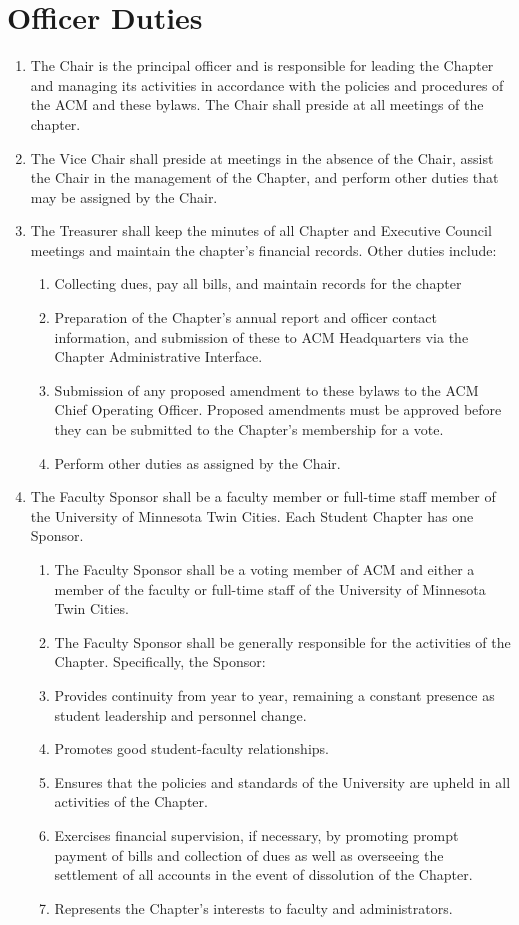 \section{Officer Duties}
\begin{enumerate}
	\item The Chair is the principal officer and is responsible for leading the Chapter and managing its activities in accordance with the policies and procedures of the ACM and these bylaws. The Chair shall preside at all meetings of the chapter.
	\item The Vice Chair shall preside at meetings in the absence of the Chair, assist the Chair in the management of the Chapter, and perform other duties that may be assigned by the Chair.
	\item The Treasurer shall keep the minutes of all Chapter and Executive Council meetings and maintain the chapter's financial records. Other duties include:
		\begin{enumerate}
			\item Collecting dues, pay all bills, and maintain records for the chapter
			\item Preparation of the Chapter's annual report and officer contact information, and submission of these to ACM Headquarters via the Chapter Administrative Interface.
			\item Submission of any proposed amendment to these bylaws to the ACM Chief Operating Officer. Proposed amendments must be approved before they can be submitted to the Chapter's membership for a vote.
			\item Perform other duties as assigned by the Chair.
		\end{enumerate}
	\item  The Faculty Sponsor shall be a faculty member or full-time staff member of the University of Minnesota Twin Cities. Each Student Chapter has one Sponsor.
		\begin{enumerate}
			\item The Faculty Sponsor shall be a voting member of ACM and either a member of the faculty or full-time staff of the University of Minnesota Twin Cities.
			\item The Faculty Sponsor shall be generally responsible for the activities of the Chapter. Specifically, the Sponsor:
			\item Provides continuity from year to year, remaining a constant presence as student leadership and personnel change.
			\item Promotes good student-faculty relationships.
			\item Ensures that the policies and standards of the University are upheld in all activities of the Chapter.
			\item Exercises financial supervision, if necessary, by promoting prompt payment of bills and collection of dues as well as overseeing the settlement of all accounts in the event of dissolution of the Chapter.
			\item Represents the Chapter’s interests to faculty and administrators.
		\end{enumerate}
\end{enumerate}

